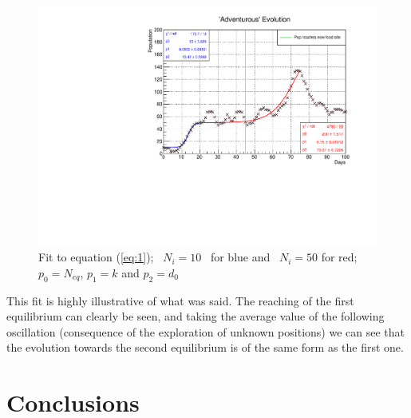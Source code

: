 \documentclass[a4paper,prd,twocolumn,nofootinbib,superscriptaddress,floatfix]{revtex4}
\begin{document}
 \begin{figure}[H]
\centering
  \includegraphics[scale=0.4]{adventurous.pdf}
\caption{Fit to equation  (\ref{eq:1}); \ $N_i=10$ \ for blue and   \ $N_i=50$ for red; $p_0= N_{eq}$, $p_1=k$ and $p_2=d_0$  }
  \label{fig:8}
\end{figure}

This fit is highly illustrative of what was said. The reaching of the first equilibrium can clearly be seen, and taking the average value of the following oscillation (consequence of the exploration of unknown positions) we can see that the evolution towards the second equilibrium is of the same form as the first one.

\section{Conclusions}
\end{document}
